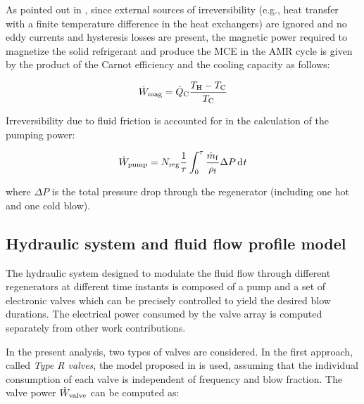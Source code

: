 \documentclass[referee]{svjour3}
\begin{document}
As pointed out in \cite{bib:fortkamp20-desig}, since external sources of irreversibility (e.g., heat transfer with a finite temperature difference in the heat exchangers) are ignored and no eddy currents and hysteresis losses are present, the magnetic power required to magnetize the solid refrigerant and produce the MCE in the AMR cycle is given by the product of the Carnot efficiency and the cooling capacity as follows:

\begin{equation}
\label{eq:100}
\dot{W}_{\mathrm{mag}} = \dot{Q}_{\mathrm{C}} \frac{T_{\mathrm{H}} - T_{\mathrm{C}}}{T_{\mathrm{C}}}
\end{equation}

Irreversibility due to fluid friction is accounted for in the calculation of the pumping power:

\begin{equation}
\label{eq:103}
\wpump = N\ped{reg}\frac{1}{\tau}\int_0^{\tau}\frac{\rate{m}\ped{f}}{\rho\ped{f}} \Delta P \diffd{t}
\end{equation}

\noindent where $\Delta P$ is the total pressure drop through the regenerator (including one hot and one cold blow).


\subsection{Hydraulic system  and fluid flow profile model}
\label{sec:hydr-syst-model}


The hydraulic system designed to modulate the fluid flow through different regenerators at different time instants is composed of a pump and a set of electronic valves which can be precisely controlled to yield the desired blow durations. The electrical power consumed by the valve array is computed separately from other work contributions.


In the present analysis, two types of valves are considered. In the first approach, called \emph{Type R valves}, the  model proposed in \cite{bib:cardoso16_trans} is used, assuming that the individual consumption of each valve is independent of frequency and blow fraction. The valve power  $\dot{W}_{\mathrm{valve}}$ can be computed as:
\end{document}
